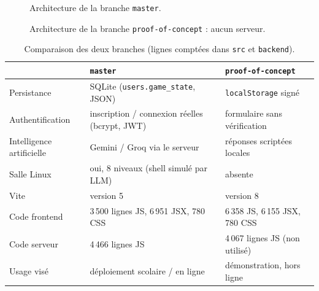 \documentclass[11pt,a4paper]{report}
\newcommand{\code}[1]{\texttt{\nolinkurl{#1}}}
\newcommand{\file}[1]{\texttt{\nolinkurl{#1}}}
\begin{document}
\begin{figure}[htbp]
\centering
{}
\caption{Architecture de la branche \texttt{master}.}
\end{figure}

\begin{figure}[htbp]
\centering
{}
\caption{Architecture de la branche \texttt{proof-of-concept} : aucun serveur.}
\end{figure}

\begin{table}[H]
\centering
\small
\begin{tabularx}{\textwidth}{@{}lXX@{}}
\toprule
 & \textbf{\code{master}} & \textbf{\code{proof-of-concept}} \\
\midrule
Persistance      & SQLite (\texttt{users.game\_state}, JSON) & \texttt{localStorage} signé \\
Authentification & inscription / connexion r\'eelles (bcrypt, JWT) & formulaire sans v\'erification \\
Intelligence artificielle & Gemini / Groq via le serveur & r\'eponses script\'ees locales \\
Salle Linux      & oui, 8 niveaux (shell simul\'e par LLM) & absente \\
Vite             & version 5 & version 8 \\
Code frontend    & 3\,500 lignes JS, 6\,951 JSX, 780 CSS & 6\,358 JS, 6\,155 JSX, 780 CSS \\
Code serveur     & 4\,466 lignes JS & 4\,067 lignes JS (non utilisé) \\
Usage vis\'e     & d\'eploiement scolaire / en ligne & d\'emonstration, hors ligne \\
\bottomrule
\end{tabularx}
\caption{Comparaison des deux branches (lignes comptées dans \file{src} et \file{backend}).}
\end{table}
\end{document}
